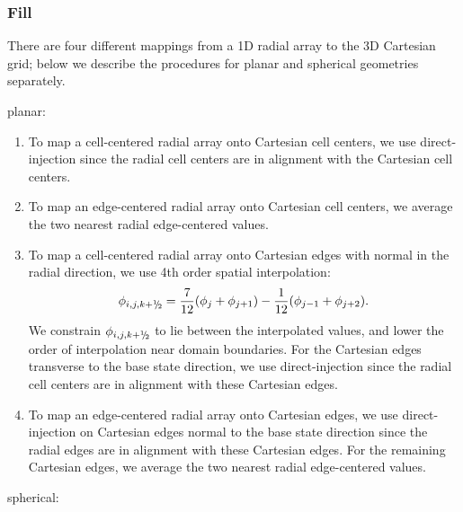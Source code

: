 \subsubsection{Fill}\label{Sec:Fill}
There are four different mappings from a 1D radial array to the 3D Cartesian grid;
below we describe the procedures for planar and spherical geometries separately.
\begin{description}
\item[planar:]
\end{description}
\begin{enumerate}
\item To map a cell-centered radial array onto Cartesian cell centers,
  we use direct-injection since the radial cell centers are in
  alignment with the Cartesian cell centers. 
\item To map an edge-centered radial array onto Cartesian 
  cell centers, we average the two nearest radial edge-centered values.
\item To map a cell-centered radial array onto Cartesian edges with normal in 
  the radial direction, we use 4th order spatial interpolation:
\begin{equation}
\phi_{i,j,k+\myhalf} = \frac{7}{12}(\phi_{j}+\phi_{j+1}) - \frac{1}{12}(\phi_{j-1}+\phi_{j+2}).
\end{equation}
  We constrain $\phi_{i,j,k+\myhalf}$ to lie between the interpolated values, and 
  lower the order of interpolation near domain boundaries.  For the 
  Cartesian edges transverse to the base state direction, we use direct-injection 
  since the radial cell centers are in alignment with these 
  Cartesian edges.
\item To map an edge-centered radial array onto Cartesian edges, 
  we use direct-injection on Cartesian edges normal to the base state direction
  since the radial edges are in alignment with these Cartesian edges.  
  For the remaining Cartesian edges, we average the two nearest radial 
  edge-centered values.
\end{enumerate}
\begin{description}
\item[spherical:] 
\end{description}
